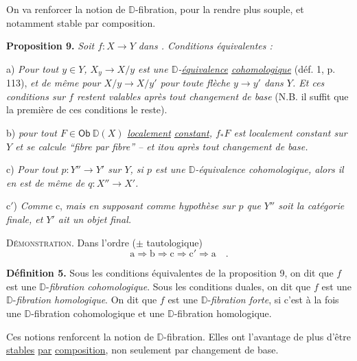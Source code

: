 \documentclass[11pt,leqno]{article}
\newcommand{\printedpage}[1]{\marginpar{\footnotesize p.~#1}}
\newcommand{\msp}[1]{\marginpar{\footnotesize [#1]}}
\newcommand{\Dia}{\mathsf{Dia}}
\newcommand{\Ob}{\mathsf{Ob}}
\newcommand{\D}{\mathbb{D}}
\begin{document}
\printedpage{72}

On va renforcer la notion de $\D$-fibration, pour la rendre plus souple, et notamment stable par composition.

\textbf{Proposition 9.} \textit{Soit $f : X \to Y$ dans \Dia. Conditions équivalentes :}

a) \textit{Pour tout $y \in Y$, $X_y \to X/y$ est une $\D$-\underline{équivalence} \underline{cohomologique}} (déf. 1, p. 113), \textit{et de même pour $X/y \to X/y'$ pour toute flèche $y \to y'$ dans $Y$. Et ces conditions sur $f$ restent valables après tout changement de base} (N.B. il suffit que la première de ces conditions le reste).

\msp{page 121}b) \textit{pour tout $F \in \Ob\ \D(X)$ \underline{localement} \underline{constant}, $f_*F$ est localement constant sur $Y$ et se calcule “fibre par fibre” -- et itou après tout changement de base.} %

c) \textit{Pour tout $p : Y'' \to Y'$ sur $Y$, si $p$ est une $\D$-équivalence cohomologique, alors il en est de même de $q : X'' \to X'$.}

c$'$) \textit{Comme} c, \textit{mais en supposant comme hypothèse sur $p$ que $Y''$ soit la catégorie finale, et $Y'$ ait un objet final.}

\textsc{Démonstration}. Dans l'ordre ($\pm$ tautologique)
\[
\mathrm{a} \Longrightarrow \mathrm{b} \Longrightarrow \mathrm{c} \Longrightarrow \mathrm{c}' \Longrightarrow \mathrm{a} \quad .
\]

\textbf{Définition 5.} Sous les conditions équivalentes de la proposition 9, on dit que $f$ est une $\D$-\textit{fibration cohomologique}. Sous les conditions duales, on dit que $f$ est une $\D$-\textit{fibration homologique}. On dit que $f$ est une $\D$-\textit{fibration forte}, si c'est à la fois une $\D$-fibration cohomologique et une $\D$-fibration homologique.

Ces notions renforcent la notion de $\D$-fibration. Elles ont l'avantage de plus d'être \underline{stables} \underline{par} \underline{composition}, non seulement par changement de base.
\end{document}
